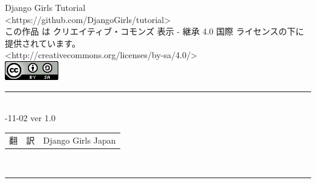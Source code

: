 \reviewcolophon
\thispagestyle{empty}

\vspace*{\fill}

{\noindent\reviewtitlefont\Large Django Girls Tutorial} \\
\medskip
{\noindent <https://github.com/DjangoGirls/tutorial>} \\
{\noindent この作品 は クリエイティブ・コモンズ 表示 - 継承 4.0 国際 ライセンスの下に提供されています。} \\
{\noindent <http://creativecommons.org/licenses/by-sa/4.0/>} \\

\includegraphics[]{./images/ccby.png}

\noindent\rule[8pt]{\textwidth}{1pt} \\
{-11-02 ver 1.0
}

\begin{tabular}{ll}
翻　訳 & Django Girls Japan \\

\end{tabular}
　\\
\rule[0pt]{\textwidth}{1pt} \\
